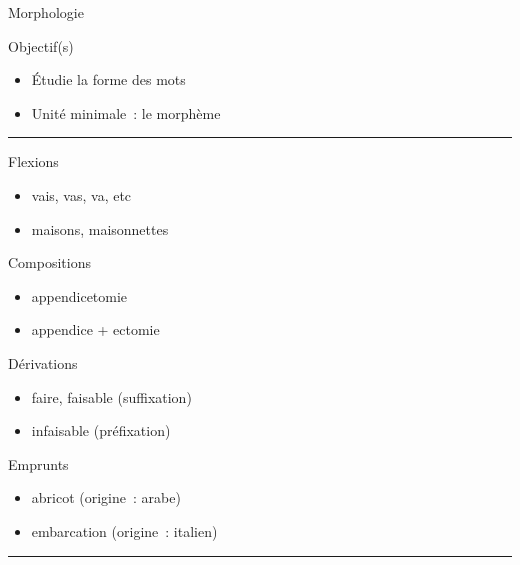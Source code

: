 \documentclass[serif, aspectratio=169]{beamer}
\begin{document}
\begin{frame}{Morphologie}
    \pause
    \begin{block}{Objectif(s)}
        \begin{itemize}
            \item Étudie la forme des mots
            \item Unité minimale~: le morphème
        \end{itemize}
    \end{block}
    \vfill
    \hrule
    \begin{minipage}{0.45\columnwidth}
        \begin{block}{Flexions}
           \begin{itemize}
            \item vais, vas, va, etc
            \item maisons, maisonnettes
           \end{itemize} 
        \end{block}
        \begin{block}{Compositions}
           \begin{itemize}
            \item appendicetomie
            \item appendice + ectomie
           \end{itemize} 
        \end{block}
    \end{minipage}
    \hfill
    \begin{minipage}{0.45\columnwidth}
        \begin{block}{Dérivations}
           \begin{itemize}
            \item faire, faisable (suffixation)
            \item infaisable (préfixation)
           \end{itemize} 
        \end{block}
        \begin{block}{Emprunts}
           \begin{itemize}
            \item abricot (origine~: arabe)
            \item embarcation (origine~: italien)
           \end{itemize} 
        \end{block}
    \end{minipage}
    \hrule
\end{frame}
\end{document}
